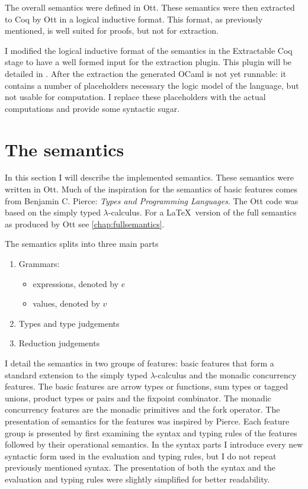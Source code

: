 \documentclass[12pt,twoside,notitlepage]{report}
\begin{document}
The overall semantics were defined in Ott. These semantics were then extracted to Coq by Ott in a logical inductive format. This format, as previously mentioned, is well suited for proofs, but not for extraction. 

I modified the logical inductive format of the semantics in the Extractable Coq stage to have a well formed input for the extraction plugin. This plugin will be detailed in . After the extraction the generated OCaml is not yet runnable: it contains a number of placeholders necessary the logic model of the language, but not usable for computation. I replace these placeholders with the actual computations and provide some syntactic sugar.
\section{The semantics}
In this section I will describe the implemented semantics. These semantics were written in Ott.  Much of the inspiration for the semantics of basic features comes from Benjamin C. Pierce: \textit{Types and Programming Languages}\cite{pierce2002types}. The Ott code was based on the simply typed $ \lambda $-calculus. For a \LaTeX\, version of the full semantics as produced by Ott see \cref{chap:fullsemantics}.

 
The semantics splits into three main parts
\begin{enumerate}
\item{Grammars:\begin{itemize}
\item{expressions, denoted by $ e $}
\item{values, denoted by $ v $}
\end{itemize}}
\item{Types and type judgements}
\item{Reduction judgements}
\end{enumerate}

I detail the semantics in two groups of features: basic features that form a standard extension to the simply typed $ \lambda $-calculus and the monadic concurrency features. The basic features are arrow types or functions, sum types or tagged unions, product types or pairs and the fixpoint combinator. The monadic concurrency features are the monadic primitives and the fork operator. The presentation of semantics for the features was inspired by Pierce\cite{pierce2002types}. Each feature group is presented by first examining the syntax and typing rules of the features followed by their operational semantics. In the syntax parts I introduce every new syntactic form used in the evaluation and typing rules, but I do not repeat previously mentioned syntax. The presentation of both the syntax and the evaluation and typing rules were slightly simplified for better readability.   
\end{document}

